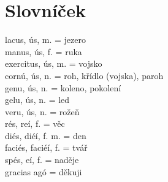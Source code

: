 \documentclass[12pt]{article}					%
\begin{document}
\newpage
\section{Slovníček}
    lacus, ús, m. = jezero\\
    manus, ús, f. = ruka\\
    exercitus, ús, m. = vojsko\\
    cornú, ús, n. = roh, křídlo (vojska), paroh\\
    genu, ús, n. = koleno, pokolení\\
    gelu, ús, n. = led\\
    veru, ús, n. = rožeň\\
    rés, reí, f. = věc\\
    diés, diéí, f. m. = den\\
    faciés, faciéí, f. = tvář\\
    spés, eí, f. = naděje\\
    gracias agó = děkuji\\

    

    
\end{document}
